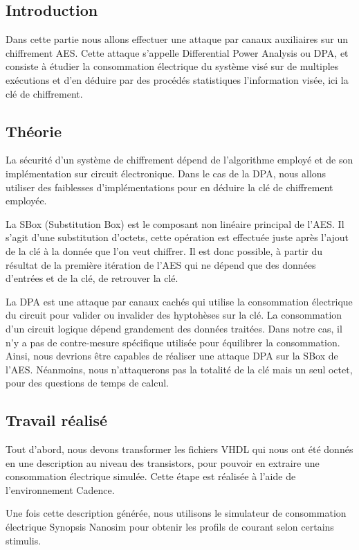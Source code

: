\subsection{Introduction}

Dans cette partie nous allons effectuer une attaque par canaux auxiliaires
sur un chiffrement AES. Cette attaque s'appelle Differential Power Analysis ou
DPA, et consiste à étudier la consommation électrique du système visé sur de
multiples exécutions et d'en déduire par des procédés statistiques l'information
visée, ici la clé de chiffrement.

\subsection{Théorie}
La sécurité d'un système de chiffrement dépend de l'algorithme employé et de
son implémentation sur circuit électronique. Dans le cas de la DPA, nous allons
utiliser des faiblesses d'implémentations pour en déduire la clé de chiffrement
employée.

La SBox (Substitution Box) est le composant non linéaire principal de l'AES. Il
s'agit d'une substitution d'octets, cette opération est effectuée juste après
l'ajout de la clé à la donnée que l'on veut chiffrer. Il est donc possible,
à partir du résultat de la première itération de l'AES qui ne dépend que
des données d'entrées et de la clé, de retrouver la clé.

La DPA est une attaque par canaux cachés qui utilise la consommation
électrique du circuit pour valider ou invalider des hyptohèses sur la clé.
La consommation d'un circuit logique dépend grandement des données traitées.
Dans notre cas, il n'y a pas de contre-mesure spécifique utilisée pour
équilibrer la consommation. Ainsi, nous devrions être capables de réaliser
une attaque DPA sur la SBox de l'AES. Néanmoins, nous n'attaquerons pas
la totalité de la clé mais un seul octet, pour des questions de temps de calcul.

\subsection{Travail réalisé}

Tout d'abord, nous devons transformer les fichiers VHDL qui nous ont été donnés
en une description au niveau des transistors, pour pouvoir en extraire une
consommation électrique simulée. Cette étape est réalisée à l'aide de
l'environnement Cadence.

Une fois cette description générée, nous utilisons le simulateur de consommation
électrique Synopsis Nanosim pour obtenir les profils de courant selon certains
stimulis.

